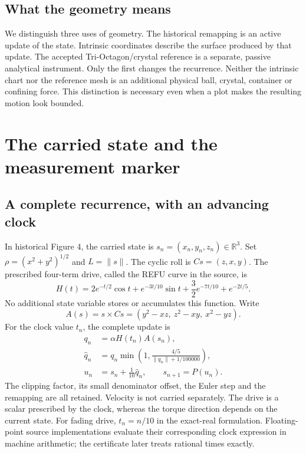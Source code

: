 \documentclass[11pt,a4paper]{article}
\numberwithin{equation}{section}
\newcommand{\R}{\mathbb R}
\begin{document}
\subsection{What the geometry means}
We distinguish three uses of geometry. The historical remapping is an active update of the state. Intrinsic coordinates describe the surface produced by that update. The accepted Tri-Octagon/crystal reference is a separate, passive analytical instrument. Only the first changes the recurrence. Neither the intrinsic chart nor the reference mesh is an additional physical ball, crystal, container or confining force. This distinction is necessary even when a plot makes the resulting motion look bounded.

\section{The carried state and the measurement marker}\label{sec:model}
\subsection{A complete recurrence, with an advancing clock}
In historical Figure 4, the carried state is $s_n=(x_n,y_n,z_n)\in\R^3$. Set $\rho=(x^2+y^2)^{1/2}$ and $L=\|s\|$. The cyclic roll is $Cs=(z,x,y)$. The prescribed four-term drive, called the REFU curve in the source, is
\begin{equation}\label{eq:drive}
H(t)=2e^{-t/2}\cos t+e^{-3t/10}\sin t+\frac32e^{-7t/10}+e^{-2t/5}.
\end{equation}
No additional state variable stores or accumulates this function. Write
\begin{equation}\label{eq:torque}
A(s)=s\times Cs=(y^2-xz,\ z^2-xy,\ x^2-yz).
\end{equation}
For the clock value $t_n$, the complete update is
\begin{equation}\label{eq:update}
\begin{aligned}
q_n&=\alpha H(t_n)A(s_n),\\
\widehat q_n&=q_n\min\left(1,\frac{4/5}{\|q_n\|+1/100000}\right),\\
u_n&=s_n+\frac1{10}\widehat q_n,\qquad s_{n+1}=P(u_n).
\end{aligned}
\end{equation}
The clipping factor, its small denominator offset, the Euler step and the remapping are all retained. Velocity is not carried separately. The drive is a scalar prescribed by the clock, whereas the torque direction depends on the current state. For fading drive, $t_n=n/10$ in the exact-real formulation. Floating-point source implementations evaluate their corresponding clock expression in machine arithmetic; the certificate later treats rational times exactly.
\end{document}
